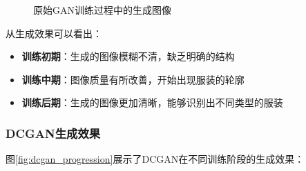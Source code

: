 \documentclass[UTF8]{ctexart}
\begin{document}
\begin{figure}[H]
\centering
{}
\caption{原始GAN训练过程中的生成图像}
\label{fig:gan_progression}
\end{figure}

从生成效果可以看出：
\begin{itemize}
\item \textbf{训练初期}：生成的图像模糊不清，缺乏明确的结构
\item \textbf{训练中期}：图像质量有所改善，开始出现服装的轮廓
\item \textbf{训练后期}：生成的图像更加清晰，能够识别出不同类型的服装
\end{itemize}

\subsubsection{DCGAN生成效果}

图\ref{fig:dcgan_progression}展示了DCGAN在不同训练阶段的生成效果：
\end{document}
